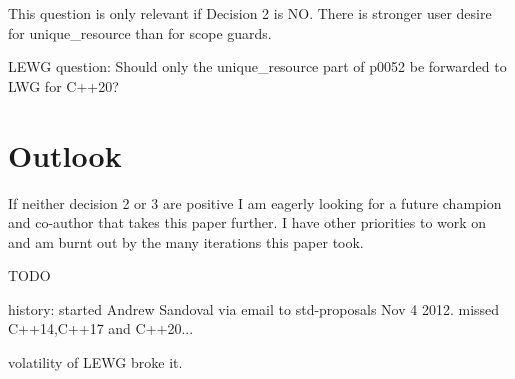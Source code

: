 \documentclass[ebook,11pt,article]{memoir}
\begin{document}
This question is only relevant if Decision 2 is NO. There is stronger user desire for unique_resource than for scope guards.

LEWG question: Should only the unique_resource part of p0052 be forwarded to LWG for C++20?


\section{Outlook}
If neither decision 2 or 3 are positive I am eagerly looking for a future champion and co-author that takes this paper further. I have other priorities to work on and am burnt out by the many iterations this paper took.

TODO

history: started Andrew Sandoval via email to std-proposals Nov 4 2012.
missed C++14,C++17 and C++20...

volatility of LEWG broke it.
\end{document}
